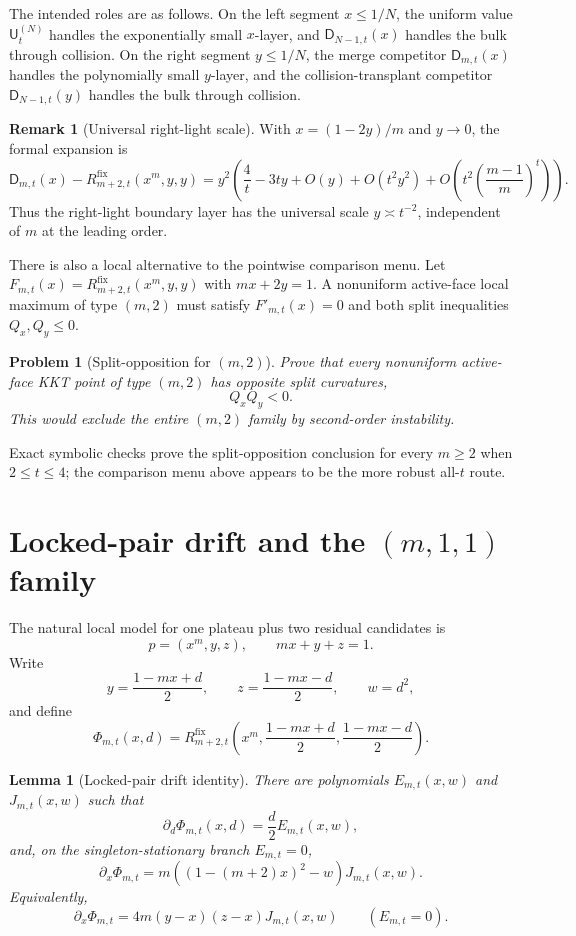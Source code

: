 \documentclass[11pt]{article}
\newtheorem{lemma}[theorem]{Lemma}
\newtheorem{problem}[theorem]{Problem}
\theoremstyle{definition}
\newtheorem{remark}[theorem]{Remark}
\newcommand{\fix}{\mathrm{fix}}
\newcommand{\Oh}{O}
\begin{document}
The intended roles are as follows.  On the left segment $x\le1/N$, the
uniform value $\mathsf U^{(N)}_t$ handles the exponentially small $x$-layer,
and $\mathsf D_{N-1,t}(x)$ handles the bulk through collision.  On the right
segment $y\le1/N$, the merge competitor $\mathsf D_{m,t}(x)$ handles the
polynomially small $y$-layer, and the collision-transplant competitor
$\mathsf D_{N-1,t}(y)$ handles the bulk through collision.

\begin{remark}[Universal right-light scale]
With $x=(1-2y)/m$ and $y\to0$, the formal expansion is
\[
\mathsf D_{m,t}(x)-R^{\fix}_{m+2,t}(x^m,y,y)
= y^2\left(\frac4t-3ty+\Oh(y)+\Oh(t^2y^2)
+\Oh\left(t^2\left(\frac{m-1}{m}\right)^t\right)\right).
\]
Thus the right-light boundary layer has the universal scale $y\asymp t^{-2}$,
independent of $m$ at the leading order.
\end{remark}

There is also a local alternative to the pointwise comparison menu.  Let
$F_{m,t}(x)=R^{\fix}_{m+2,t}(x^m,y,y)$ with $mx+2y=1$.  A nonuniform
active-face local maximum of type $(m,2)$ must satisfy $F'_{m,t}(x)=0$ and
both split inequalities $Q_x,Q_y\le0$.

\begin{problem}[Split-opposition for $(m,2)$]\label{prob:m2-split}
Prove that every nonuniform active-face KKT point of type $(m,2)$ has
opposite split curvatures,
\[
  Q_xQ_y<0.
\]
This would exclude the entire $(m,2)$ family by second-order instability.
\end{problem}

Exact symbolic checks prove the split-opposition conclusion for every
$m\ge2$ when $2\le t\le4$; the comparison menu above appears to be the more
robust all-$t$ route.

\section{Locked-pair drift and the $(m,1,1)$ family}\label{sec:m11}

The natural local model for one plateau plus two residual candidates is
\[
  p=(x^m,y,z),
  \qquad mx+y+z=1.
\]
Write
\[
  y=\frac{1-mx+d}{2},
  \qquad
  z=\frac{1-mx-d}{2},
  \qquad
  w=d^2,
\]
and define
\[
  \Phi_{m,t}(x,d)
  =R^{\fix}_{m+2,t}\left(x^m,\frac{1-mx+d}{2},\frac{1-mx-d}{2}\right).
\]

\begin{lemma}[Locked-pair drift identity]\label{lem:locked-drift}
There are polynomials $E_{m,t}(x,w)$ and $J_{m,t}(x,w)$ such that
\[
  \partial_d\Phi_{m,t}(x,d)=\frac d2 E_{m,t}(x,w),
\]
and, on the singleton-stationary branch $E_{m,t}=0$,
\[
  \partial_x\Phi_{m,t}
  =m\left((1-(m+2)x)^2-w\right)J_{m,t}(x,w).
\]
Equivalently,
\[
  \partial_x\Phi_{m,t}=4m(y-x)(z-x)J_{m,t}(x,w)
  \qquad(E_{m,t}=0).
\]
\end{lemma}
\end{document}
